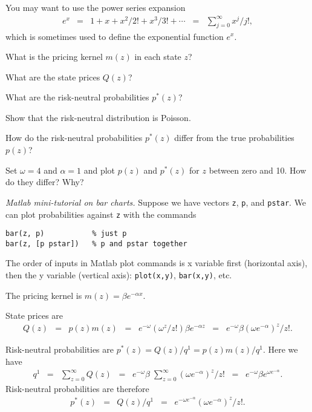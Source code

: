 \documentclass[11pt]{exam}
\begin{document}
\begin{questions}
You may want to use the power series expansion
\begin{eqnarray*}
    e^x &=& 1 + x + x^2/2! + x^3/3! + \cdots
            \;\;=\;\; \sum_{j=0}^\infty x^j/j! ,
\end{eqnarray*}
which is sometimes used to define the exponential function $e^x$.
%
\begin{parts}
\item What is the pricing kernel $m(z)$ in each state $z$?
\item What are the state prices $Q(z)$?
\item What are the risk-neutral probabilities $p^*(z)$?
\item Show that the risk-neutral distribution is Poisson.
\item How do the risk-neutral probabilities $p^*(z)$
differ from the true probabilities $p(z)$?
\item Set $\omega = 4$ and $ \alpha = 1$
and plot $p(z)$ and $p^*(z)$ for $z$ between zero and 10.
How do they differ?  Why?
\end{parts}
{\it Matlab mini-tutorial on bar charts.\/}
Suppose we have vectors {\tt z}, {\tt p}, and {\tt pstar}.
We can plot probabilities against {\tt z} with the commands
\begin{verbatim}
bar(z, p)           % just p
bar(z, [p pstar])   % p and pstar together
\end{verbatim}
The order of inputs in Matlab plot commands is
x variable first (horizontal axis), then the y variable (vertical axis):
{\tt plot(x,y)}, {\tt bar(x,y)}, etc.

\begin{solution}
\begin{parts}
\item The pricing kernel is $ m(z) = \beta e^{-\alpha x} $.
\item State prices are
\begin{eqnarray*}
    Q(z) &=& p(z) m(z) \;\;=\;\; e^{-\omega} (\omega^z/z!) \beta e^{-\alpha z}
            \;\;=\;\; e^{-\omega} \beta (\omega e^{-\alpha})^z /z!.
\end{eqnarray*}
\item Risk-neutral probabilities are $ p^*(z) = Q(z)/q^1 = p(z) m(z) / q^1 $.
Here we have
\begin{eqnarray*}
    q^1 &=&  \sum_{z=0}^\infty Q(z)
            \;\;=\;\; e^{-\omega} \beta \; \sum_{z=0}^\infty (\omega e^{-\alpha})^z /z!
            \;\;=\;\; e^{-\omega} \beta e^{\omega e^{-\alpha}} .
\end{eqnarray*}
Risk-neutral probabilities are therefore
\begin{eqnarray*}
    p^*(z) &=&  Q(z) / q^1
            \;\;=\;\;  e^{-\omega e^{-\alpha}} (\omega e^{-\alpha})^z /z!.
\end{eqnarray*}


\end{parts}
\end{solution}
\end{questions}
\end{document}
